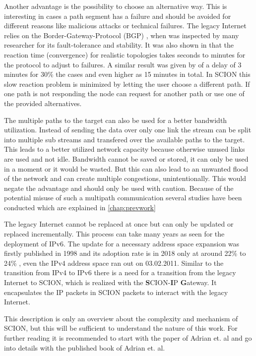 \documentclass[thesis.tex]{subfiles}
\begin{document}
Another advantage is the possibility to choose an alternative way. This is interesting in cases a path segment has a failure and should be avoided for different reasons like malicious attacks or technical failures. The legacy Internet relies on the Border-Gateway-Protocol (BGP) \cite{rekhter2005border, Halabi.1997}, when was inspected by many researcher for its fault-tolerance and stability. It was also shown in \cite{Sahoo.2006} that the reaction time (convergence) for realistic topologies takes seconds to minutes for the protocol to adjust to failures. A similar result was given by \cite{Labovitz.2001} of a delay of 3 minutes for 30\% the cases and even higher as 15 minutes in total. In SCION this slow reaction problem is minimized by letting the user choose a different path. If one path is not responding the node can request for another path or use one of the provided alternatives.

The multiple paths to the target can also be used for a better bandwidth utilization. Instead of sending the data over only one link the stream can be split into multiple sub streams and transfered over the available paths to the target. 
This leads to a better utilized network capacity because otherwise unused links are used and not idle. Bandwidth  cannot be saved or stored, it can only be used in a moment or it would be wasted. But this can also lead to an unwanted flood of the network and can create multiple congestions, unintentionally. This would negate the advantage and should only be used with caution. Because of the potential misuse of such a multipath communication several studies have been conducted which are explained in \autoref{chap:prevwork}

The legacy Internet cannot be replaced at once but can only be updated or replaced incrementally. This process can take many years as seen for the deployment of IPv6. The update for a necessary address space expansion was firstly published in 1998\cite{Deering.1998} and its adoption rate is in 2018 only at around 22\% \cite{GoogleInc.} to 24\% \cite{Ripenetworkcoordinationcentre.18.04.2018}, even the IPv4 address space ran out on 03.02.2011\cite{ICANN.03.02.2011}. Similar to the transition from IPv4 to IPv6 there is a need for a transition from the legacy Internet to SCION, which is realized with the \textbf{S}CION-\textbf{I}P \textbf{G}ateway. It encapsulates the IP packets in SCION packets to interact with the legacy Internet.

This description is only an overview about the complexity and mechanism of SCION, but this will be sufficient to understand the nature of this work. For further reading it is recommended to start with the paper of Adrian et. al\cite{SCIONPaper} and go into details with the published book of Adrian et. al\cite{SCIONBook}.
\end{document}
